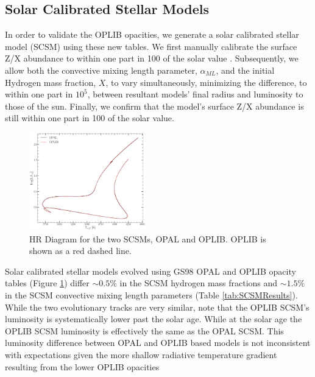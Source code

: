 \subsection{Solar Calibrated Stellar Models}\label{sec:SCSM}


In order to validate the OPLIB opacities, we generate a solar calibrated
stellar model (SCSM) using these new tables. We first manually calibrate the
surface Z/X abundance to within one part in 100 of the solar value \citep[][Z/X=0.23]{Grevesse1998}.
Subsequently, we allow both the convective mixing length parameter,
$\alpha_{ML}$, and the initial Hydrogen mass fraction, $X$, to vary
simultaneously, minimizing the difference, to within one part in $10^{5}$,
between resultant models' final radius and luminosity to those of the sun.
Finally, we confirm that the model's surface Z/X abundance is still within one
part in 100 of the solar value.

\begin{figure}
	\centering
	\includegraphics[width=0.45\textwidth]{figures/jaoOpacity/HRDiagramOPALvsOPLIB_SCCM.pdf}
	\caption{HR Diagram for the two SCSMs, OPAL and OPLIB. OPLIB is shown as a red
	dashed line.}
	\label{fig:OPLIBOPALHR}
\end{figure}

Solar calibrated stellar models evolved using GS98 OPAL and OPLIB opacity
tables (Figure \ref{fig:OPLIBOPALHR}) differ $\sim 0.5\%$ in the SCSM hydrogen
mass fractions and $\sim 1.5\%$ in the SCSM convective mixing length parameters
(Table \ref{tab:SCSMResults}). While the two evolutionary tracks are very
similar, note that the OPLIB SCSM's luminosity is systematically lower past the
solar age. While at the solar age the OPLIB SCSM luminosity is effectively the
same as the OPAL SCSM. This luminosity difference between OPAL and OPLIB based
models is not inconsistent with expectations given the more shallow radiative
temperature gradient resulting from the lower OPLIB opacities

